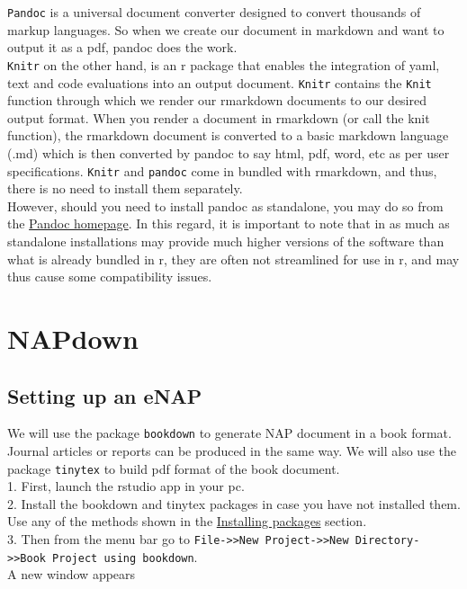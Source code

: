 \documentclass[
]{book}
\begin{document}
\texttt{Pandoc} is a universal document converter designed to convert thousands of markup languages. So when we create our document in markdown and want to output it as a pdf, pandoc does the work.\\
\texttt{Knitr} on the other hand, is an r package that enables the integration of yaml, text and code evaluations into an output document. \texttt{Knitr} contains the \texttt{Knit} function through which we render our rmarkdown documents to our desired output format.
When you render a document in rmarkdown (or call the knit function), the rmarkdown document is converted to a basic markdown language (.md) which is then converted by pandoc to say html, pdf, word, etc as per user specifications.
\texttt{Knitr} and \texttt{pandoc} come in bundled with rmarkdown, and thus, there is no need to install them separately.\\
However, should you need to install pandoc as standalone, you may do so from the \href{http://pandoc.org}{Pandoc homepage}. In this regard, it is important to note that in as much as standalone installations may provide much higher versions of the software than what is already bundled in r, they are often not streamlined for use in r, and may thus cause some compatibility issues.

\hypertarget{napdown}{%
\chapter{NAPdown}\label{napdown}}

\hypertarget{setting-up-an-enap}{%
\section{Setting up an eNAP}\label{setting-up-an-enap}}

We will use the package \texttt{bookdown} to generate NAP document in a book format. Journal articles or reports can be produced in the same way.
We will also use the package \texttt{tinytex} to build pdf format of the book document.\\
1. First, launch the rstudio app in your pc.\\
2. Install the bookdown and tinytex packages in case you have not installed them. Use any of the methods shown in the \protect\hyperlink{installing-packages}{Installing packages} section.\\
3. Then from the menu bar go to \texttt{File-\textgreater{}\textgreater{}New\ Project-\textgreater{}\textgreater{}New\ Directory-\textgreater{}\textgreater{}Book\ Project\ using\ bookdown}.\\
A new window appears
\end{document}
